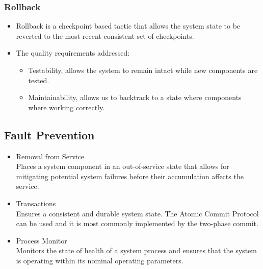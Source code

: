 \documentclass[12pt, oneside]{article}
\begin{document}
		\subsubsection{Rollback}
		\begin{itemize}
			\item Rollback is a checkpoint based tactic that allows the system state to be reverted to the most recent consistent set of checkpoints.
	
			\item The quality requirements addressed:
			\begin{itemize}
				\item Testability, allows the system to remain intact while new components are tested.
				\item Maintainability, allows us to backtrack to a state where components where working correctly.
			\end{itemize}
		\end{itemize}
	
	\subsection{Fault Prevention}
		\begin{itemize}
			
			\item Removal from Service\\
			Places a system component in an out-of-service state that allows for mitigating potential system failures before their accumulation affects the service.
			
			\item Transactions\\
			Ensures a consistent and durable system state. The Atomic Commit Protocol can be used and it is most commonly implemented by the two-phase commit.
			
			\item Process Monitor\\
			Monitors the state of health of a system process and ensures that the system is operating within its nominal operating parameters.
		\end{itemize}
	
\end{document}
